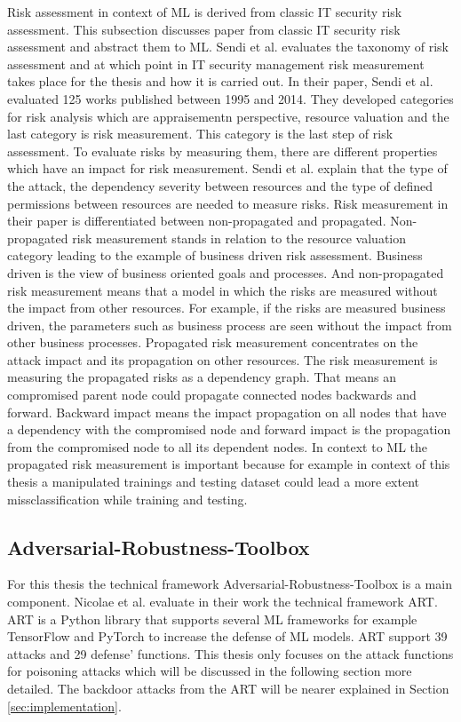Risk assessment in context of ML is derived from classic IT security risk assessment. This subsection discusses paper from classic IT security risk assessment and abstract them to ML.
Sendi et al. \cite{DBLP:journals/compsec/SendiAC16} evaluates the taxonomy of risk assessment and at which point in IT security management risk measurement takes place for the thesis and
how it is carried out. In their paper, Sendi et al. evaluated 125 works published between 1995 and 2014. They developed categories for risk analysis which are appraisementn perspective,
resource valuation and the last category is risk measurement. This category is the last step of risk assessment. To evaluate risks by measuring them, there are different properties which
have an impact for risk measurement. Sendi et al. explain that the type of the attack, the dependency severity between resources and the type of defined permissions between resources are
needed to measure risks. Risk measurement in their paper is differentiated between non-propagated and propagated. Non-propagated risk measurement stands in relation to the resource
valuation category leading to the example of business driven risk assessment. Business driven is the view of business oriented goals and processes. And non-propagated risk measurement
means that a model in which the risks are measured without the impact from other resources. For example, if the risks are measured business driven, the parameters such as business process
are seen without the impact from other business processes. Propagated risk measurement concentrates on the attack impact and its propagation on other resources. The risk measurement is
measuring the propagated risks as a dependency graph. That means an compromised parent node could propagate connected nodes backwards and forward. Backward impact means the impact
propagation on all nodes that have a dependency with the compromised node and forward impact is the propagation from the compromised node to all its dependent nodes. In context to ML the
propagated risk measurement is important because for example in context of this thesis a manipulated trainings and testing dataset could lead a more extent missclassification while
training and testing.

\subsection{Adversarial-Robustness-Toolbox}

For this thesis the technical framework Adversarial-Robustness-Toolbox \cite{art2018} is a main component. Nicolae et al. \cite{DBLP:journals/corr/abs-1807-01069} evaluate in their work
the technical framework ART. ART is a Python library that supports several ML frameworks for example TensorFlow and PyTorch to increase the defense of ML models. ART support 39 attacks
and 29 defense' functions. This thesis only focuses on the attack functions for poisoning attacks which will be discussed in the following section more detailed. The backdoor attacks from the ART will be nearer explained in Section \ref{sec:implementation}.

